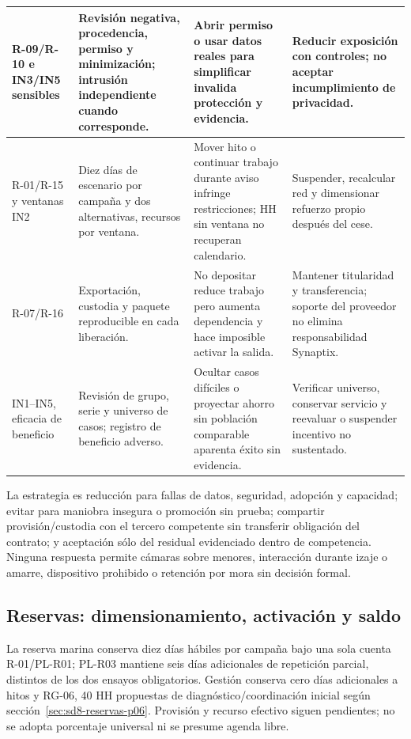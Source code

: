 \begin{longtable}{L{.13\textwidth}L{.29\textwidth}L{.30\textwidth}L{.19\textwidth}}
R-09/R-10 e IN3/IN5 sensibles & Revisión negativa, procedencia, permiso y minimización; intrusión independiente cuando corresponde. & Abrir permiso o usar datos reales para simplificar invalida protección y evidencia. & Reducir exposición con controles; no aceptar incumplimiento de privacidad.\\\hline
R-01/R-15 y ventanas IN2 & Diez días de escenario por campaña y dos alternativas, recursos por ventana. & Mover hito o continuar trabajo durante aviso infringe restricciones; HH sin ventana no recuperan calendario. & Suspender, recalcular red y dimensionar refuerzo propio después del cese.\\\hline
R-07/R-16 & Exportación, custodia y paquete reproducible en cada liberación. & No depositar reduce trabajo pero aumenta dependencia y hace imposible activar la salida. & Mantener titularidad y transferencia; soporte del proveedor no elimina responsabilidad Synaptix.\\\hline
IN1--IN5, eficacia de beneficio & Revisión de grupo, serie y universo de casos; registro de beneficio adverso. & Ocultar casos difíciles o proyectar ahorro sin población comparable aparenta éxito sin evidencia. & Verificar universo, conservar servicio y reevaluar o suspender incentivo no sustentado.\\\hline
\end{longtable}\endgroup
{}
La estrategia es reducción para fallas de datos, seguridad, adopción y capacidad; evitar para maniobra insegura o promoción sin prueba; compartir provisión/custodia con el tercero competente sin transferir obligación del contrato; y aceptación sólo del residual evidenciado dentro de competencia. Ninguna respuesta permite cámaras sobre menores, interacción durante izaje o amarre, dispositivo prohibido o retención por mora sin decisión formal.

\subsection{Reservas: dimensionamiento, activación y saldo}
La reserva marina conserva diez días hábiles por campaña bajo una sola cuenta R-01/PL-R01; PL-R03 mantiene seis días adicionales de repetición parcial, distintos de los dos ensayos obligatorios. Gestión conserva cero días adicionales a hitos y RG-06, 40 HH propuestas de diagnóstico/coordinación inicial según sección~\ref{sec:sd8-reservas-p06}. Provisión y recurso efectivo siguen pendientes; no se adopta porcentaje universal ni se presume agenda libre.

